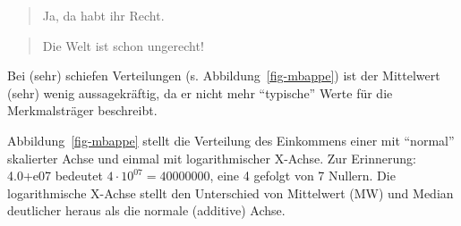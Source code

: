 \documentclass[
  letterpaper,
]{scrbook}
\theoremstyle{definition}
\theoremstyle{definition}
\theoremstyle{definition}
\theoremstyle{remark}
\begin{document}
\begin{quote}
{} Ja, da habt ihr Recht.
\end{quote}

\begin{quote}
{} Die Welt ist schon ungerecht!
\end{quote}

\begin{tcolorbox}[enhanced jigsaw, left=2mm, toptitle=1mm, toprule=.15mm, rightrule=.15mm, leftrule=.75mm, breakable, colbacktitle=quarto-callout-important-color!10!white, colback=white, coltitle=black, bottomtitle=1mm, opacityback=0, title=\textcolor{quarto-callout-important-color}{\faExclamation}\hspace{0.5em}{Wichtig}, colframe=quarto-callout-important-color-frame, arc=.35mm, opacitybacktitle=0.6, bottomrule=.15mm, titlerule=0mm]

Bei (sehr) schiefen Verteilungen (s. Abbildung~\ref{fig-mbappe}) ist der
Mittelwert (sehr) wenig aussagekräftig, da er nicht mehr ``typische''
Werte für die Merkmalsträger beschreibt.

\end{tcolorbox}

Abbildung~\ref{fig-mbappe} stellt die Verteilung des Einkommens einer
mit ``normal'' skalierter Achse und einmal mit logarithmischer X-Achse.
Zur Erinnerung: 4.0+e07 bedeutet \(4 \cdot 10^{07} = 40000000\), eine 4
gefolgt von 7 Nullern. Die logarithmische X-Achse stellt den Unterschied
von Mittelwert (MW) und Median deutlicher heraus als die normale
(additive) Achse.
\end{document}
